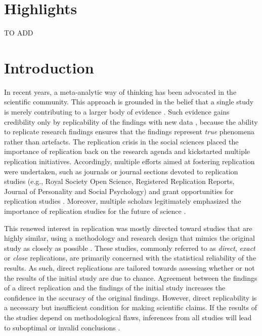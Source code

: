 \documentclass[
  authoryear,
  preprint,
  5p,
  twocolumn]{elsarticle}
\begin{document}

\hypertarget{highlights}{%
\section{Highlights}\label{highlights}}

TO ADD

\hypertarget{introduction}{%
\section{Introduction}\label{introduction}}

In recent years, a meta-analytic way of thinking has been advocated in
the scientific community. This approach is grounded in the belief that a
single study is merely contributing to a larger body of evidence
\citep[e.g.,][]{asendorpf_recommendations_2016, cumming_new_2014, goodman_reproducibility_2016}.
Such evidence gains credibility only by replicability of the findings
with new data \citep{schmidt_replication_2009}, because the ability to
replicate research findings ensures that the findings represent
\emph{true} phenomena rather than artefacts. The replication crisis in
the social sciences placed the importance of replication back on the
research agenda and kickstarted multiple replication initiatives.
Accordingly, multiple efforts aimed at fostering replication were
undertaken, such as journals or journal sections devoted to replication
studies (e.g., Royal Society Open Science, Registered Replication
Reports, Journal of Personality and Social Psychology) and grant
opportunities for replication studies
\citep[e.g.,][]{nwo_replication_2020}. Moreover, multiple scholars
legitimately emphasized the importance of replication studies for the
future of science
\citep[e.g.,][]{baker_reproducibility_2016, brandt_et_al_replication_2014, munafo_manifesto_2017}.

This renewed interest in replication was mostly directed toward studies
that are highly similar, using a methodology and research design that
mimics the original study as closely as possible
\citep[e.g.,][]{camerer2016evaluating, camerer2018evaluating, klein_etal_replicability_2014, nosek_replicability_review_2021, open_science_collab_2015}.
These studies, commonly referred to as \emph{direct}, \emph{exact} or
\emph{close} replications, are primarily concerned with the statistical
reliability of the results. As such, direct replications are tailored
towards assessing whether or not the results of the initial study are
due to chance. Agreement between the findings of a direct replication
and the findings of the initial study increases the confidence in the
accuracy of the original findings. However, direct replicability is a
necessary but insufficient condition for making scientific claims. If
the results of the studies depend on methodological flaws, inferences
from all studies will lead to suboptimal or invalid conclusions
\citep{lawlor_triangulation_2017, munafo_robust_2018}.
\end{document}
